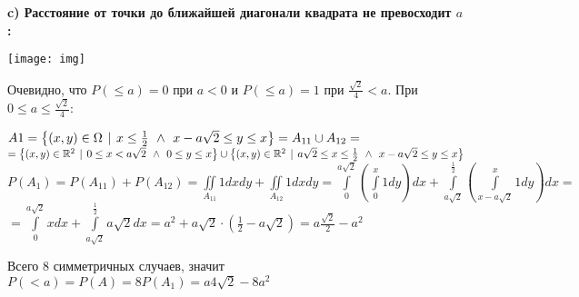 \documentclass{article}
\begin{document}
	\bf c) \rm Расстояние от точки до ближайшей диагонали квадрата не превосходит $a$:\\
	\begin{center} \texttt{[image: img]} \end{center}
	Очевидно, что $P(\leq a) = 0$ при $a < 0$ и $P(\leq a)=1$ при $\frac{\sqrt{2}}{4}<a$. При $0 \leq a \leq \frac{\sqrt{2}}{4}$: \\
	\begin{center}
	$A1 = \left\lbrace(x, y) \in \Omega \hspace{4px}|\hspace{4px} x \leq \frac{1}{2} \hspace{4px}\wedge\hspace{4px} x - a\sqrt{2} \leq y \leq x \right\rbrace = A_{11} \cup A_{12}
	=$\\$= \left\lbrace(x, y) \in \mathbb{R}^2 \hspace{4px}|\hspace{4px} 0 \leq x < a\sqrt{2} \hspace{4px}\wedge\hspace{4px} 0 \leq y \leq x \right\rbrace 
	\cup \left\lbrace(x, y) \in \mathbb{R}^2 \hspace{4px}|\hspace{4px} a\sqrt{2} \leq x \leq \frac{1}{2} \hspace{4px}\wedge\hspace{4px} x - a\sqrt{2} \leq y \leq x \right\rbrace$ \\
	
	$P(A_1) = P(A_{11}) + P(A_{12}) =  \iint\limits_{A_{11}}1dxdy + \iint\limits_{A_{12}}1dxdy 
	= \int\limits_0^{a\sqrt{2}} \left( \int\limits_0^x 1dy \right)dx + \int\limits_{a\sqrt{2}}^{\frac{1}{2}} \left( \int\limits_{x-a\sqrt{2}}^x 1dy \right)dx = $\\
	$= \int\limits_0^{a\sqrt{2}} x dx + \int\limits_{a\sqrt{2}}^{\frac{1}{2}}  a\sqrt{2}dx 
	= a^2 + a\sqrt{2}\cdot(\frac{1}{2} - a\sqrt{2}) = a\frac{\sqrt{2}}{2} - a^2
	$
	
	\end{center}
	Всего 8 симметричных случаев, значит $P(<a) = P(A) = 8P(A_1) = a4\sqrt{2} - 8a^2$
\end{document}
